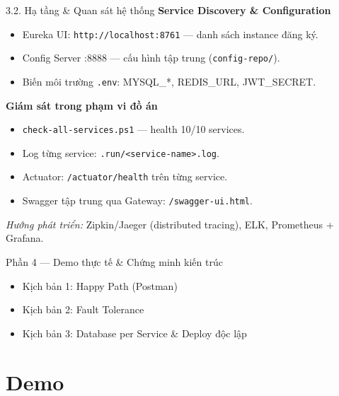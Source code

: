 \documentclass[aspectratio=169,12pt]{beamer}
\begin{document}
\begin{frame}{3.2. Hạ tầng \& Quan sát hệ thống}
  \textbf{Service Discovery \& Configuration}
  \begin{itemize}
    \item Eureka UI: \texttt{http://localhost:8761} — danh sách instance đăng ký.
    \item Config Server :8888 — cấu hình tập trung (\texttt{config-repo/}).
    \item Biến môi trường \texttt{.env}: MYSQL\_*, REDIS\_URL, JWT\_SECRET.
  \end{itemize}

  \vspace{0.5em}
  \textbf{Giám sát trong phạm vi đồ án}
  \begin{itemize}
    \item \texttt{check-all-services.ps1} — health 10/10 services.
    \item Log từng service: \texttt{.run/<service-name>.log}.
    \item Actuator: \texttt{/actuator/health} trên từng service.
    \item Swagger tập trung qua Gateway: \texttt{/swagger-ui.html}.
  \end{itemize}

  \vspace{0.3em}
  \textit{Hướng phát triển:} Zipkin/Jaeger (distributed tracing), ELK, Prometheus + Grafana.
\end{frame}

\begin{frame}{Phần 4 — Demo thực tế \& Chứng minh kiến trúc}
  \begin{itemize}
    \item Kịch bản 1: Happy Path (Postman)
    \item Kịch bản 2: Fault Tolerance
    \item Kịch bản 3: Database per Service \& Deploy độc lập
  \end{itemize}
\end{frame}

\section{Demo}
\end{document}
